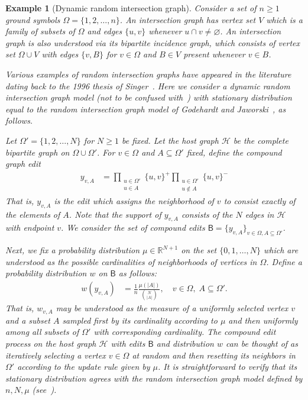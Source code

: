 \documentclass[11pt,a4paper]{article}
\newtheorem{example}[theorem]{Example}
\begin{document}
\begin{example}[Dynamic random intersection graph]\label{ex:random-intersection}\normalfont
    Consider a set of $n\geq 1$ ground symbols $\Omega = \{1, 2,\dotsc, n\}$. An \emph{intersection graph} has vertex set $V$ which is a family of subsets of $\Omega$ and edges $\{u, v\}$ whenever $u\cap v \neq\varnothing$. An intersection graph is also understood via its bipartite incidence graph, which consists of vertex set $\Omega \cup V$ with edges $\{v, B\}$ for $v\in \Omega$ and $B\in V$ present whenever $v\in B$.
    
    Various examples of random intersection graphs have appeared in the literature dating back to the 1996 thesis of Singer~\cite{singer1996random}. Here we consider a dynamic random intersection graph model (not to be confused with~\cite{milewska2025dynamic}) with stationary distribution equal to the random intersection graph model of Godehardt and Jaworski~\cite{godehardt2001two}, as follows.
    
    Let $\Omega' = \{1, 2,\dotsc, N\}$ for $N\geq 1$ be fixed. Let the host graph $\mathcal{H}$ be the complete bipartite graph on $\Omega\cup \Omega'$. For $v\in \Omega$ and $A\subseteq \Omega'$ fixed, define the compound graph edit
        \begin{align*}
            y_{v, A} &= \prod_{\substack{u\in\Omega' \\ u\in A}} \{u, v\}^+ \prod_{\substack{u\in\Omega' \\ u\notin A}} \{u, v\}^-
        \end{align*}
    That is, $y_{v, A}$ is the edit which assigns the neighborhood of $v$ to consist exactly of the elements of $A$. Note that the support of $y_{v, A}$ consists of the $N$ edges in $\mathcal{H}$ with endpoint $v$. We consider the set of compound edits $\mathsf{B} = \{y_{v, A}\}_{v\in \Omega, A\subseteq\Omega'}$. 

    Next, we fix a probability distribution $\mu\in\mathbb{R}^{N+1}$ on the set $\{0, 1,\dotsc, N\}$ which are understood as the possible cardinalities of neighborhoods of vertices in $\Omega$. Define a probability distribution $w$ on $\mathsf{B}$ as follows:
        \begin{align*}
            w({y_{v, A}}) &= \frac{1}{n}\frac{\mu(|A|)}{\binom{N}{|A|}},\quad v\in\Omega,\;A\subseteq\Omega'.
        \end{align*}
    That is, $w_{v, A}$ may be understood as the measure of a uniformly selected vertex $v$ and a subset $A$ sampled first by its cardinality according to $\mu$ and then uniformly among all subsets of $\Omega'$ with corresponding cardinality. The compound edit process on the host graph $\mathcal{H}$ with edits $\mathsf{B}$ and distribution $w$ can be thought of as iteratively selecting a vertex $v\in\Omega$ at random and then resetting its neighbors in $\Omega'$ according to the update rule given by $\mu$. It is straightforward to verify that its stationary distribution agrees with the random intersection graph model defined by $n, N, \mu$ (see~\cite{godehardt2001two}). 


\end{example}
\end{document}
